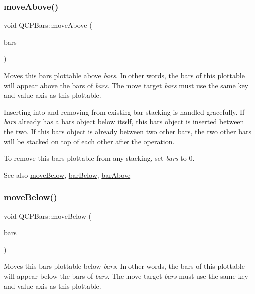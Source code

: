 \subsubsection{\texorpdfstring{move\+Above()}{moveAbove()}}
{\footnotesize\ttfamily void Q\+C\+P\+Bars\+::move\+Above (\begin{DoxyParamCaption}\item[{\mbox{\hyperlink{class_q_c_p_bars}{Q\+C\+P\+Bars}} $\ast$}]{bars }\end{DoxyParamCaption})}

Moves this bars plottable above {\itshape bars}. In other words, the bars of this plottable will appear above the bars of {\itshape bars}. The move target {\itshape bars} must use the same key and value axis as this plottable.

Inserting into and removing from existing bar stacking is handled gracefully. If {\itshape bars} already has a bars object below itself, this bars object is inserted between the two. If this bars object is already between two other bars, the two other bars will be stacked on top of each other after the operation.

To remove this bars plottable from any stacking, set {\itshape bars} to 0.

\begin{DoxySeeAlso}{See also}
\mbox{\hyperlink{class_q_c_p_bars_a69fc371346980f19177c3d1ecdad78ee}{move\+Below}}, \mbox{\hyperlink{class_q_c_p_bars_a1b58664864b141f45e02044a855b3213}{bar\+Below}}, \mbox{\hyperlink{class_q_c_p_bars_ab97f2acd9f6cb40d2cc3c33d278f0e78}{bar\+Above}} 
\end{DoxySeeAlso}
\mbox{\label{class_q_c_p_bars_a69fc371346980f19177c3d1ecdad78ee}} 
\subsubsection{\texorpdfstring{move\+Below()}{moveBelow()}}
{\footnotesize\ttfamily void Q\+C\+P\+Bars\+::move\+Below (\begin{DoxyParamCaption}\item[{\mbox{\hyperlink{class_q_c_p_bars}{Q\+C\+P\+Bars}} $\ast$}]{bars }\end{DoxyParamCaption})}

Moves this bars plottable below {\itshape bars}. In other words, the bars of this plottable will appear below the bars of {\itshape bars}. The move target {\itshape bars} must use the same key and value axis as this plottable.

